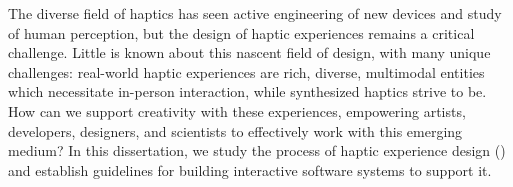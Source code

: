 The diverse field of haptics has seen active engineering of new devices and study of human perception, but the design of haptic experiences remains a critical challenge.
Little is known about this nascent field of design, with many unique challenges: real-world haptic experiences are rich, diverse, multimodal entities which necessitate in-person interaction, while synthesized haptics strive to be.
How can we support creativity with these experiences, empowering artists, developers, designers, and scientists to effectively work with this emerging medium?
In this dissertation, we study the process of haptic experience design (\haxd) and establish guidelines for building interactive software systems to support it.
%
%
%
%
%
%
%
